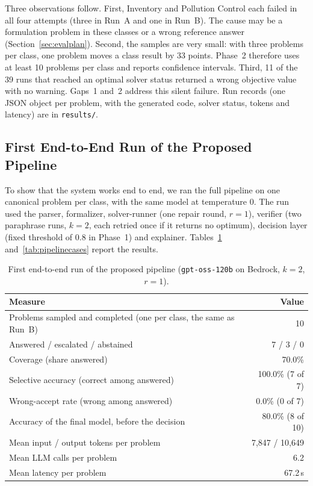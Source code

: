 \documentclass[11pt,a4paper]{article}
\begin{document}
\FloatBarrier
Three observations follow. First, Inventory and Pollution Control each failed in all four attempts (three in Run~A and one in Run~B). The cause may be a formulation problem in these classes or a wrong reference answer (Section~\ref{sec:evalplan}). Second, the samples are very small: with three problems per class, one problem moves a class result by 33 points. Phase~2 therefore uses at least 10 problems per class and reports confidence intervals. Third, 11 of the 39 runs that reached an optimal solver status returned a wrong objective value with no warning. Gaps~1 and~2 address this silent failure. Run records (one JSON object per problem, with the generated code, solver status, tokens and latency) are in \texttt{results/}.

\FloatBarrier
\subsection{First End-to-End Run of the Proposed Pipeline}
\label{sec:pipelinerun}

To show that the system works end to end, we ran the full pipeline on one canonical problem per class, with the same model at temperature 0. The run used the parser, formalizer, solver-runner (one repair round, $r = 1$), verifier (two paraphrase runs, $k = 2$, each retried once if it returns no optimum), decision layer (fixed threshold of 0.8 in Phase~1) and explainer. Tables~\ref{tab:pipeline} and~\ref{tab:pipelinecases} report the results.

\begin{table}[!htbp]
\centering
\caption{First end-to-end run of the proposed pipeline (\texttt{gpt-oss-120b} on Bedrock, $k = 2$, $r = 1$).}
\label{tab:pipeline}
\small
\begin{tabular}{@{}lr@{}}
\toprule
\textbf{Measure} & \textbf{Value}\\
\midrule
Problems sampled and completed (one per class, the same as Run~B) & 10\\
Answered / escalated / abstained & 7 / 3 / 0\\
Coverage (share answered) & 70.0\%\\
Selective accuracy (correct among answered) & 100.0\% (7 of 7)\\
Wrong-accept rate (wrong among answered) & 0.0\% (0 of 7)\\
Accuracy of the final model, before the decision & 80.0\% (8 of 10)\\
Mean input / output tokens per problem & 7,847 / 10,649\\
Mean LLM calls per problem & 6.2\\
Mean latency per problem & 67.2\,s\\
\bottomrule
\end{tabular}
\end{table}
\end{document}
